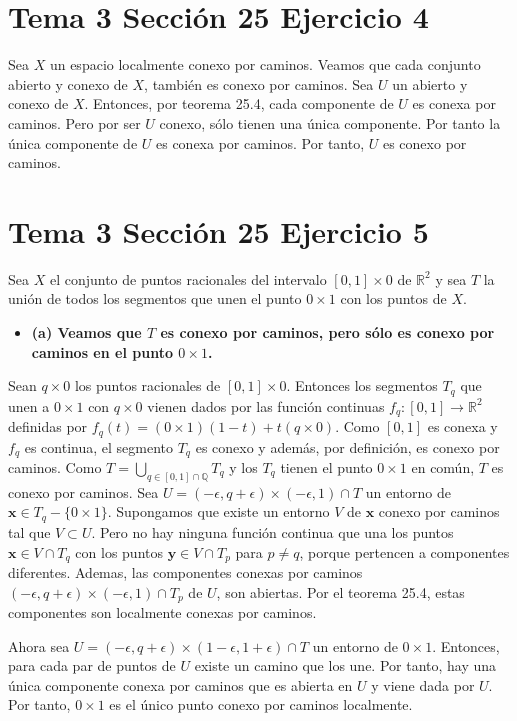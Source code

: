 \documentclass{article}
\newcommand{\vect}[1]{\boldsymbol{#1}}
\begin{document}
\section{Tema 3 Sección 25 Ejercicio 4}
Sea $X$ un espacio localmente conexo por caminos. Veamos que cada conjunto abierto y conexo de $X$, también es conexo por caminos. Sea $U$ un abierto y conexo de $X$.  Entonces, por teorema 25.4, cada componente de $U$ es conexa por caminos. Pero por ser $U$ conexo, sólo tienen una única componente. Por tanto la única componente de $U$ es conexa por caminos. Por tanto, $U$ es conexo por caminos.
\section{Tema 3 Sección 25 Ejercicio 5}
Sea $X$ el conjunto de puntos racionales del intervalo $[0,1]\times 0$ de $\mathbb{R}^2$ y sea $T$ la unión de todos los segmentos que unen el punto $0\times 1$ con los puntos de $X$.
\begin{itemize}
\item \bf (a) \rm Veamos que $T$ es conexo por caminos, pero sólo es conexo por caminos en el punto $0\times 1$.
\end{itemize}
Sean $q\times 0$ los puntos racionales de $[0,1]\times 0$. Entonces los segmentos $T_q$ que unen a $0\times 1$ con $q\times 0$ vienen dados por las función continuas $f_q:[0,1]\rightarrow\mathbb{R}^2$ definidas por $f_q(t)= (0\times 1)(1-t)+t (q\times 0)$. Como $[0,1]$ es conexa y $f_q$ es continua, el segmento $T_q$ es conexo y además, por definición, es conexo por caminos. Como $T=\bigcup_{q\in[0,1]\cap \mathbb{Q}} T_q$ y los $T_q$ tienen el punto $0\times 1$ en común, $T$ es conexo por caminos. Sea $U=(-\epsilon,q+\epsilon)\times (-\epsilon,1)\cap T$ un entorno de $\vect{x}\in T_q-\{0\times 1\}$. Supongamos que existe un entorno $V$ de $\vect{x}$ conexo por caminos tal que $V\subset U$. Pero no hay ninguna función continua que una los puntos $\vect{x}\in V\cap T_q$ con los puntos 
$\vect{y}\in V\cap T_p$ para $p\neq q$, porque pertencen a componentes diferentes. Ademas, las componentes conexas por caminos $(-\epsilon,q+\epsilon)\times (-\epsilon,1)\cap T_p$ de $U$, son abiertas. Por el teorema 25.4, estas componentes son localmente conexas por caminos.

Ahora sea $U=(-\epsilon,q+\epsilon)\times (1-\epsilon,1+\epsilon)\cap T$ un entorno de $0\times 1$. Entonces, para cada par de puntos de $U$ existe un camino que los une. Por tanto, hay una única componente conexa por caminos que es abierta en $U$ y viene dada por $U$. Por tanto, $0\times 1$ es el único punto conexo por caminos localmente.
\end{document}
